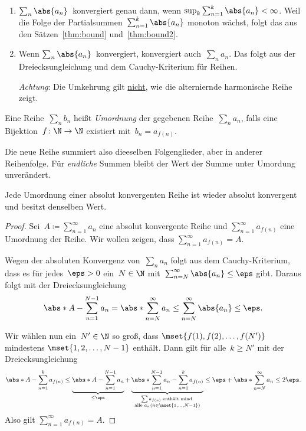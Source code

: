\documentclass[a4paper]{article}
\begin{document}
\begin{remark}\leavevmode
    \begin{enumerate}
        \item $\sum_n \abs{a_n}$~konvergiert genau dann, wenn $\sup_{k} \sum_{n=1}^k \abs{a_n} < \infty$. Weil die Folge der Partialsummen~$\sum_{n=1}^k \abs{a_n}$ monoton wächst, folgt das aus den Sätzen~\ref{thm:bound} und~\ref{thm:bound2}.
        \item Wenn $\sum_n \abs{a_n}$~konvergiert, konvergiert auch~$\sum_n a_n$. Das folgt aus der Dreiecksungleichung und dem Cauchy-Kriterium für Reihen.

              \emph{Achtung}: Die Umkehrung gilt \underline{nicht}, wie die alterniernde harmonische Reihe zeigt.
    \end{enumerate}
\end{remark}

\begin{definition}[Umordnung]
    Eine Reihe~$\sum_n b_n$ heißt \emph{Umordnung} der gegebenen Reihe~$\sum_n a_n$, falls eine Bijektion~$f\colon \N\to\N$ existiert mit~$b_n = a_{f(n)}$.
\end{definition}

Die neue Reihe summiert also dieeselben Folgenglieder, aber in anderer Reihenfolge. Für \emph{endliche} Summen bleibt der Wert der Summe unter Umordung unverändert.

\begin{theorem}[Umordnungssatz]\label{thm:series:rearrangement}
    Jede Umordnung einer absolut konvergenten Reihe ist wieder absolut konvergent und besitzt denselben Wert.
\end{theorem}

\begin{proof}
    Sei~$A \coloneqq \sum_{n=1}^\infty a_n$ eine absolut konvergente Reihe und $\sum_{n=1}^\infty a_{f(n)}$ eine Umordnung der Reihe. Wir wollen zeigen, dass $\sum_{n=1}^\infty a_{f(n)} = A$.

    Wegen der absoluten Konvergenz von~$\sum_n a_n$ folgt aus dem Cauchy-Kriterium, dass es für jedes~$\eps > 0$ ein~$N \in \N$ mit~$\sum_{n=N}^\infty \abs{a_n} \leq \eps$ gibt. Daraus folgt mit der Dreiecksungleichung
    \begin{equation*}
        \abs*{A - \sum_{n=1}^{N-1} a_n} = \abs*{\sum_{n=N}^\infty a_n} \leq \sum_{n=N}^\infty \abs{a_n} \leq \eps.
    \end{equation*}

    Wir wählen nun ein~$N' \in \N$ so groß, dass $\mset{f(1),f(2),\dots,f(N')}$ mindestens $\mset{1, 2,\dots,N-1}$ enthält. Dann gilt für alle~$k \geq N'$ mit der Dreiecksungleichung
    \begin{equation*}
        \abs*{A - \sum_{n=1}^k a_{f(n)}} \leq \underbrace{\abs*{A - \sum_{n=1}^{N-1} a_n}}_{\leq\eps} + \underbrace{\abs*{\sum_{n=1}^{N-1} a_n - \sum_{n=1}^k a_{f(n)}}}_{\substack{\sum a_{f(n)} \text{ enthält mind.}\\\text{alle } a_n (n\in\mset{1,\dots,N-1})}} \leq \eps + \abs*{\sum_{n=N}^\infty a_n} \leq 2\eps.
    \end{equation*}
    Also gilt $\sum_{n=1}^\infty a_{f(n)} = A$.
\end{proof}
\end{document}
